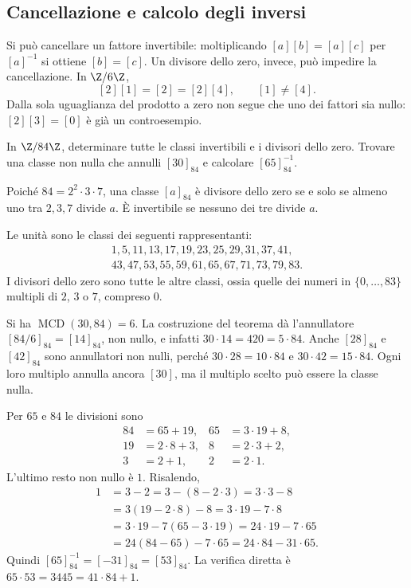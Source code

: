 \subsection{Cancellazione e calcolo degli inversi}
\begin{osservazione}
Si può cancellare un fattore invertibile: moltiplicando $[a][b]=[a][c]$ per $[a]^{-1}$ si ottiene $[b]=[c]$. Un divisore dello zero, invece, può impedire la cancellazione. In $\Z/6\Z$,
\[
[2][1]=[2]=[2][4],\qquad [1]\ne[4].
\]
Dalla sola uguaglianza del prodotto a zero non segue che uno dei fattori sia nullo: $[2][3]=[0]$ è già un controesempio.
\end{osservazione}

\begin{esercizio}
In $\Z/84\Z$, determinare tutte le classi invertibili e i divisori dello zero. Trovare una classe non nulla che annulli $[30]_{84}$ e calcolare $[65]_{84}^{-1}$.
\end{esercizio}
\begin{svolgimento}
Poiché $84=2^2\cdot3\cdot7$, una classe $[a]_{84}$ è divisore dello zero se e solo se almeno uno tra $2,3,7$ divide $a$. È invertibile se nessuno dei tre divide $a$.

Le unità sono le classi dei seguenti rappresentanti:
\[
\begin{gathered}
1,5,11,13,17,19,23,25,29,31,37,41,\\
43,47,53,55,59,61,65,67,71,73,79,83.
\end{gathered}
\]
I divisori dello zero sono tutte le altre classi, ossia quelle dei numeri in $\{0,\ldots,83\}$ multipli di $2$, $3$ o $7$, compreso $0$.

Si ha $\operatorname{MCD}(30,84)=6$. La costruzione del teorema dà l'annullatore $[84/6]_{84}=[14]_{84}$, non nullo, e infatti $30\cdot14=420=5\cdot84$. Anche $[28]_{84}$ e $[42]_{84}$ sono annullatori non nulli, perché $30\cdot28=10\cdot84$ e $30\cdot42=15\cdot84$. Ogni loro multiplo annulla ancora $[30]$, ma il multiplo scelto può essere la classe nulla.

Per $65$ e $84$ le divisioni sono
\[
\begin{aligned}
84&=65+19,&65&=3\cdot19+8,\\
19&=2\cdot8+3,&8&=2\cdot3+2,\\
3&=2+1,&2&=2\cdot1.
\end{aligned}
\]
L'ultimo resto non nullo è $1$. Risalendo,
\[
\begin{aligned}
1&=3-2=3-(8-2\cdot3)=3\cdot3-8\\
 &=3(19-2\cdot8)-8=3\cdot19-7\cdot8\\
 &=3\cdot19-7(65-3\cdot19)=24\cdot19-7\cdot65\\
 &=24(84-65)-7\cdot65=24\cdot84-31\cdot65.
\end{aligned}
\]
Quindi $[65]_{84}^{-1}=[-31]_{84}=[53]_{84}$. La verifica diretta è $65\cdot53=3445=41\cdot84+1$.
\end{svolgimento}

